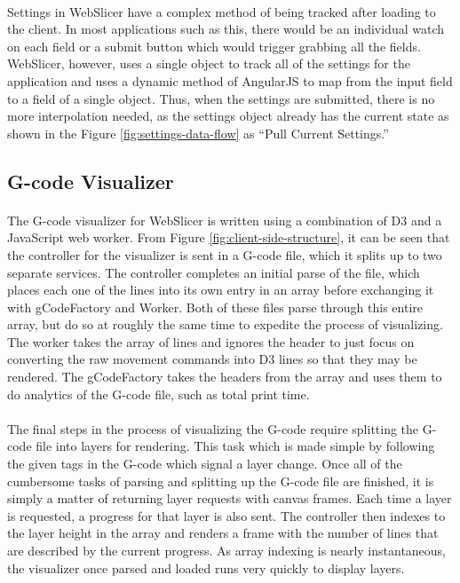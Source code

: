 \paragraph{}
Settings in WebSlicer have a complex method of being tracked after loading to the client.
In most applications such as this, there would be an individual watch on each field or a submit button which would trigger grabbing all the fields.
WebSlicer, however, uses a single object to track all of the settings for the application and uses a dynamic method of AngularJS to map from the input field to a field of a single object.
Thus, when the settings are submitted, there is no more interpolation needed, as the settings object already has the current state as shown in the Figure \ref{fig:settings-data-flow} as ``Pull Current Settings.''

\subsection{G-code Visualizer}
\paragraph{}
The G-code visualizer for WebSlicer is written using a combination of D3 and a JavaScript web worker.
From Figure \ref{fig:client-side-structure}, it can be seen that the controller for the visualizer is sent in a G-code file, which it splits up to two separate services.
The controller completes an initial parse of the file, which places each one of the lines into its own entry in an array before exchanging it with gCodeFactory and Worker.
Both of these files parse through this entire array, but do so at roughly the same time to expedite the process of visualizing.
The worker takes the array of lines and ignores the header to just focus on converting the raw movement commands into D3 lines so that they may be rendered.
The gCodeFactory takes the headers from the array and uses them to do analytics of the G-code file, such as total print time.

\paragraph{}
The final steps in the process of visualizing the G-code require splitting the G-code file into layers for rendering.
This task which is made simple by following the given tags in the G-code which signal a layer change.
Once all of the cumbersome tasks of parsing and splitting up the G-code file are finished, it is simply a matter of returning layer requests with canvas frames.
Each time a layer is requested, a progress for that layer is also sent.
The controller then indexes to the layer height in the array and renders a frame with the number of lines that are described by the current progress.
As array indexing is nearly instantaneous, the visualizer once parsed and loaded runs very quickly to display layers.

